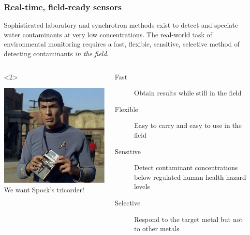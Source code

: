\documentclass[10pt, xcolor=x11names, compress]{beamer}
\begin{document}
\begin{frame}
  \frametitle{Real-time, field-ready sensors}

  Sophisticated laboratory and synchrotron methods exist to detect
  and speciate water contaminants at very low concentrations.  The
  real-world task of environmental monitoring requires a
  fast, flexible, sensitive, selective method of detecting
  contaminants \textit{in the field}.

  \medskip

  \begin{columns}[T]
    \begin{column}{0.25\linewidth}<2>
      \begin{center}
        \includegraphics[width=1.1\linewidth]{images/spock+tricorder.jpg}\\
        \small We want Spock's tricorder!
      \end{center}
    \end{column}
    \begin{column}{0.75\linewidth}
      \begin{description}
      \item[Fast] Obtain results while still in the field
      \item[Flexible] Easy to carry and easy to use in the field
      \item[Sensitive] Detect contaminant concentrations below
        regulated human health hazard levels
      \item[Selective] Respond to the target metal but not to other
        metals
      \end{description}
    \end{column}
  \end{columns}
\end{frame}
\end{document}
